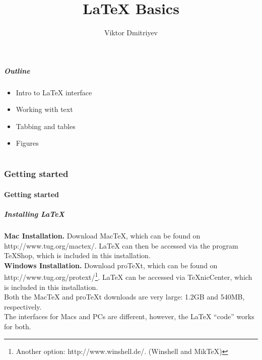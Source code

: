 \documentclass[slidestop,compress,mathserif]{beamer}
\title{LaTeX Basics}
\subtitle{}
\author{Viktor Dmitriyev}
\institute{Adapter from Mini Course on LaTeX by \href{https://github.com/OpenIntroOrg/mini-course-materials}{David Diez}}
\date{}
\begin{document}
\newenvironment{act}[1]{{\color{command}#1}}{}


\frame{ \titlepage }

\begin{frame}
  \frametitle{Outline}
  \begin{itemize}
  \item Intro to LaTeX interface
  \item Working with text
  \item Tabbing and tables
  \item Figures
  \end{itemize}
\end{frame}

\part{}

\section[Getting started]{Getting started}

\subsection[Getting started]{Getting started}

\begin{frame} \frametitle{Installing LaTeX}
{\bf Mac Installation. } Download MacTeX, which can be found on {\color{highlight}http://www.tug.org/mactex/}. LaTeX can then be accessed via the program TeXShop, which is included in this installation. \\
\vspace{0.5cm}
{\bf Windows Installation. } Download proTeXt, which can be found on {\color{highlight}http://www.tug.org/protext/}\footnote{Another option: {\color{highlight}http://www.winshell.de/}. (Winshell and MikTeX)}. LaTeX can be accessed via TeXnicCenter, which is included in this installation. \\
\vspace{0.5cm}
Both the MacTeX and proTeXt downloads are very large: 1.2GB and 540MB, respectively. \\
\vspace{0.5cm}
The interfaces for Macs and PCs are different, however, the LaTeX ``code'' works for both.
\end{frame}
\end{document}
